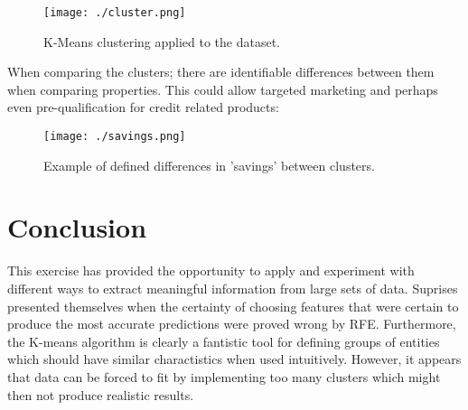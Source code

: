 \documentclass[a4paper]{article}
\begin{document}
\begin{figure}[H]
\begin{center}
\texttt{[image: ./cluster.png]}
\end{center}
\caption{K-Means clustering applied to the dataset.}
\end{figure}

When comparing the clusters; there are identifiable differences between them when comparing properties.  This could allow targeted marketing and perhaps even pre-qualification for credit related products:

\begin{figure}[H]
\begin{center}
\texttt{[image: ./savings.png]}
\end{center}
\caption{Example of defined differences in 'savings' between clusters.}
\end{figure}

\section{Conclusion}
This exercise has provided the opportunity to apply and experiment with different ways to extract meaningful information from large sets of data.  Suprises presented themselves when the certainty of choosing features that were certain to produce the most accurate predictions were proved wrong by RFE.  Furthermore, the K-means algorithm is clearly a fantistic tool for defining groups of entities which should have similar charactistics when used intuitively.  However, it appears that data can be forced to fit by implementing too many clusters which might then not produce realistic results.      
\end{document}
